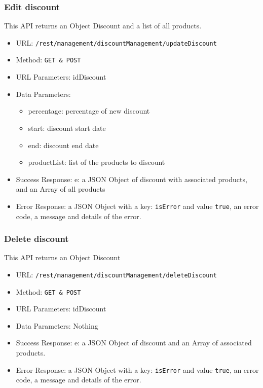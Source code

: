 \subsubsection*{Edit discount}
This API returns an Object Discount and a list of all products.

\begin{itemize}
    \item URL: \texttt{/rest/management/discountManagement/updateDiscount}
    \item Method: \texttt{{GET \& POST}}
    \item URL Parameters: idDiscount
    \item Data Parameters: 
    \begin{itemize}
        \item percentage: percentage of new discount
        \item start: discount start date
        \item end: discount end date
        \item productList: list of the products to discount
    \end{itemize}
    \item Success Response: e: a JSON Object of discount with associated products, and an Array of all products 
    \item Error Response: a JSON Object with a key: \texttt{isError}  and value \texttt{true}, an error code, a message and details of the error.
\end{itemize}

\subsubsection*{Delete discount}
This API returns an Object Discount

\begin{itemize}
    \item URL: \texttt{/rest/management/discountManagement/deleteDiscount}
    \item Method: \texttt{{GET \& POST}}
    \item URL Parameters: idDiscount
    \item Data Parameters: Nothing
    \item Success Response: e: a JSON Object of discount and an Array of associated products. 
    \item Error Response: a JSON Object with a key: \texttt{isError}  and value \texttt{true}, an error code, a message and details of the error.
\end{itemize}

